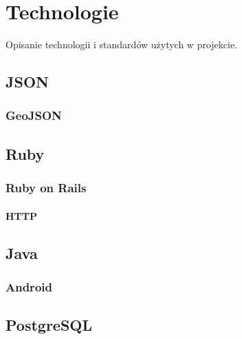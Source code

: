 \chapter{Technologie}

Opisanie technologii i standardów użytych w projekcie.

\section{JSON}
\subsection{GeoJSON}

\section{Ruby}
\subsection{Ruby on Rails}
\subsubsection{HTTP}
\section{Java}
\subsection{Android}
\section{PostgreSQL}